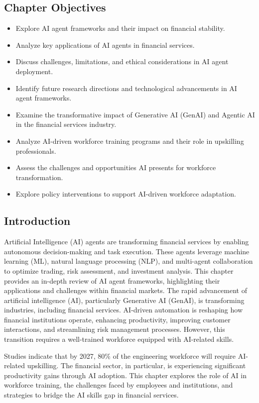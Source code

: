 \documentclass[a4paper,headinclude=on,footinclude=on,12pt,oneside]{scrbook}
\begin{document}
\subsection*{Chapter Objectives}
\begin{itemize}
	\item Explore AI agent frameworks and their impact on financial stability.
	\item Analyze key applications of AI agents in financial services.
	\item Discuss challenges, limitations, and ethical considerations in AI agent deployment.
	\item Identify future research directions and technological advancements in AI agent frameworks.
	\item Examine the transformative impact of Generative AI (GenAI) and Agentic AI in the financial services industry.
	\item Analyze AI-driven workforce training programs and their role in upskilling professionals.
	\item Assess the challenges and opportunities AI presents for workforce transformation.
	\item Explore policy interventions to support AI-driven workforce adaptation.
\end{itemize}

\subsection*{Introduction}
Artificial Intelligence (AI) agents are transforming financial services by enabling autonomous decision-making and task execution. These agents leverage machine learning (ML), natural language processing (NLP), and multi-agent collaboration to optimize trading, risk assessment, and investment analysis. This chapter provides an in-depth review of AI agent frameworks, highlighting their applications and challenges within financial markets.
The rapid advancement of artificial intelligence (AI), particularly Generative AI (GenAI), is transforming industries, including financial services. AI-driven automation is reshaping how financial institutions operate, enhancing productivity, improving customer interactions, and streamlining risk management processes. However, this transition requires a well-trained workforce equipped with AI-related skills.

Studies indicate that by 2027, 80\% of the engineering workforce will require AI-related upskilling. The financial sector, in particular, is experiencing significant productivity gains through AI adoption. This chapter explores the role of AI in workforce training, the challenges faced by employees and institutions, and strategies to bridge the AI skills gap in financial services.
\end{document}
